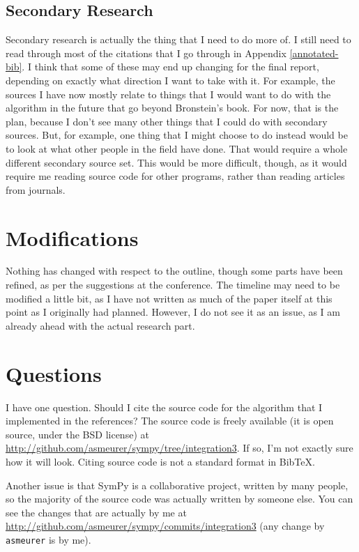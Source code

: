 \documentclass[12pt]{article}
\newcommand{\BibTeX}{{\sc Bib}\TeX}
\begin{document}
\subsection{Secondary Research}
Secondary research is actually the thing that I need to do more of. I
still need to read through most of the citations that I go through in
Appendix \ref{annotated-bib}.  I think that some of these may end up
changing for the final report, depending on exactly what direction I
want to take with it.  For example, the sources I have now mostly relate
to things that I would want to do with the algorithm in the future that
go beyond Bronstein's book.  For now, that is the plan, because I don't
see many other things that I could do with secondary sources.  But, for
example, one thing that I might choose to do instead would be to look at
what other people in the field have done.  That would require a whole
different secondary source set.  This would be more difficult, though,
as it would require me reading source code for other programs, rather
than reading articles from journals.

\section{Modifications}
Nothing has changed with respect to the outline, though some parts have
been refined, as per the suggestions at the conference.  The timeline
may need to be modified a little bit, as I have not written as much of
the paper itself at this point as I originally had planned.  However, I
do not see it as an issue, as I am already ahead with the actual
research part.

\section{Questions}
I have one question.  Should I cite the source code for the algorithm
that I implemented in the references?  The source code is freely
available (it is open source, under the BSD license) at
\url{http://github.com/asmeurer/sympy/tree/integration3}.  If so, I'm
not exactly sure how it will look.  Citing source code is not a standard
format in \BibTeX.  

Another issue is that Sym\-Py is a collaborative project, written by many
people, so the majority of the source code was actually written by
someone else.  You can see the changes that are actually by me at
\url{http://github.com/asmeurer/sympy/commits/integration3} (any change
by \texttt{asmeurer} is by me).
\end{document}
